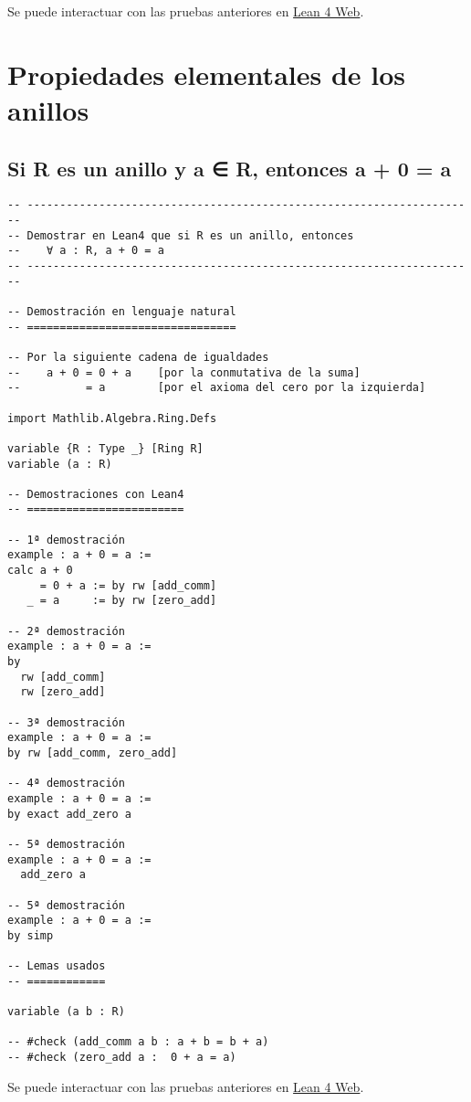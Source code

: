 Se puede interactuar con las pruebas anteriores en \href{https://lean.math.hhu.de/\#url=https://raw.githubusercontent.com/jaalonso/Calculemus2/main/src/Inverso\_del\_producto.lean}{Lean 4 Web}.

\chapter{Propiedades elementales de los anillos}
\label{sec:orgfe80267}

\section{Si R es un anillo y a ∈ R, entonces a + 0 = a}
\label{sec:org44f06dd}
\begin{verbatim}
-- ---------------------------------------------------------------------
-- Demostrar en Lean4 que si R es un anillo, entonces
--    ∀ a : R, a + 0 = a
-- ---------------------------------------------------------------------

-- Demostración en lenguaje natural
-- ================================

-- Por la siguiente cadena de igualdades
--    a + 0 = 0 + a    [por la conmutativa de la suma]
--          = a        [por el axioma del cero por la izquierda]

import Mathlib.Algebra.Ring.Defs

variable {R : Type _} [Ring R]
variable (a : R)

-- Demostraciones con Lean4
-- ========================

-- 1ª demostración
example : a + 0 = a :=
calc a + 0
     = 0 + a := by rw [add_comm]
   _ = a     := by rw [zero_add]

-- 2ª demostración
example : a + 0 = a :=
by
  rw [add_comm]
  rw [zero_add]

-- 3ª demostración
example : a + 0 = a :=
by rw [add_comm, zero_add]

-- 4ª demostración
example : a + 0 = a :=
by exact add_zero a

-- 5ª demostración
example : a + 0 = a :=
  add_zero a

-- 5ª demostración
example : a + 0 = a :=
by simp

-- Lemas usados
-- ============

variable (a b : R)

-- #check (add_comm a b : a + b = b + a)
-- #check (zero_add a :  0 + a = a)
\end{verbatim}
Se puede interactuar con las pruebas anteriores en \href{https://lean.math.hhu.de/\#url=https://raw.githubusercontent.com/jaalonso/Calculemus2/main/src/Suma\_con\_cero.lean}{Lean 4 Web}.

